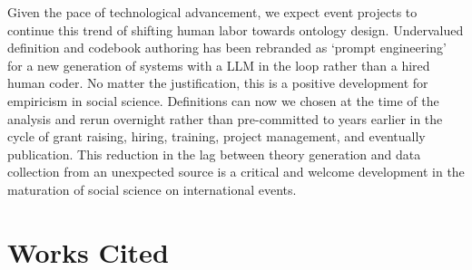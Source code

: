 \documentclass[
  letterpaper,
  DIV=11,
  numbers=noendperiod]{scrartcl}
\begin{document}
Given the pace of technological advancement, we expect event projects to
continue this trend of shifting human labor towards ontology design.
Undervalued definition and codebook authoring has been rebranded as
`prompt engineering' for a new generation of systems with a LLM in the
loop rather than a hired human coder. No matter the justification, this
is a positive development for empiricism in social science. Definitions
can now we chosen at the time of the analysis and rerun overnight rather
than pre-committed to years earlier in the cycle of grant raising,
hiring, training, project management, and eventually publication. This
reduction in the lag between theory generation and data collection from
an unexpected source is a critical and welcome development in the
maturation of social science on international events.

\hypertarget{works-cited}{%
\section*{Works Cited}\label{works-cited}}
\end{document}
